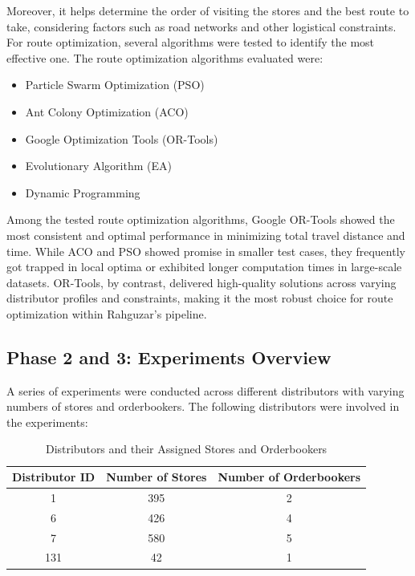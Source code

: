Moreover, it helps determine the order of visiting the stores and the best route to take, considering factors such as road networks and other logistical constraints. For route optimization, several algorithms were tested to identify the most effective one. The route optimization algorithms evaluated were:

\begin{itemize}
    \item Particle Swarm Optimization (PSO)
    \item Ant Colony Optimization (ACO)
    \item Google Optimization Tools (OR-Tools)
    \item Evolutionary Algorithm (EA)
    \item Dynamic Programming
\end{itemize}

Among the tested route optimization algorithms, Google OR-Tools showed the most consistent and optimal performance in minimizing total travel distance and time. While ACO and PSO showed promise in smaller test cases, they frequently got trapped in local optima or exhibited longer computation times in large-scale datasets. OR-Tools, by contrast, delivered high-quality solutions across varying distributor profiles and constraints, making it the most robust choice for route optimization within Rahguzar's pipeline.




\subsection{Phase 2 and 3: Experiments Overview}
A series of experiments were conducted across different distributors with varying numbers of stores and orderbookers. The following distributors were involved in the experiments:
\begin{table}[h!]
\centering
\begin{tabular}{|c|c|c|}
\hline
\textbf{Distributor ID} & \textbf{Number of Stores} & \textbf{Number of Orderbookers} \\
\hline
1 & 395 & 2 \\
6 & 426 & 4 \\
7 & 580 & 5 \\
131 & 42 & 1 \\
\hline
\end{tabular}
\caption{Distributors and their Assigned Stores and Orderbookers}
\end{table}

